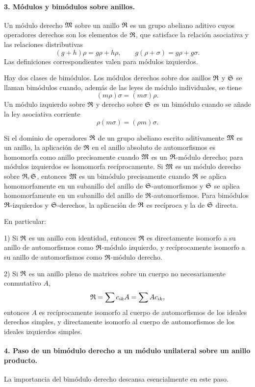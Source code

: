 \paragraph{3. Módulos y bimódulos sobre anillos.}
Un módulo derecho \(\mathfrak M\) sobre un anillo \(\mathfrak R\) es un grupo abeliano aditivo cuyos operadores derechos son los elementos de \(\mathfrak R\), que satisface la relación asociativa y las relaciones distributivas
\[
        (g+h)\rho=g\rho+h\rho,\qquad
        g(\rho+\sigma)=g\rho+g\sigma.                                  \tag{3a}
\]
Las definiciones correspondientes valen para módulos izquierdos.

Hay dos clases de bimódulos. Los módulos derechos sobre dos anillos \(\mathfrak R\) y \(\mathfrak S\) se llaman bimódulos cuando, además de las leyes de módulo individuales, se tiene
\[
        (m\rho)\sigma=(m\sigma)\rho.
\]
Un módulo izquierdo sobre \(\mathfrak R\) y derecho sobre \(\mathfrak S\) es un bimódulo cuando se añade la ley asociativa corriente
\[
        \rho(m\sigma)=(\rho m)\sigma .
\]

Si el dominio de operadores \(\mathfrak R\) de un grupo abeliano escrito aditivamente \(\mathfrak M\) es un anillo, la aplicación de \(\mathfrak R\) en el anillo absoluto de automorfismos es homomorfa como anillo precisamente cuando \(\mathfrak M\) es un \(\mathfrak R\)-módulo derecho; para módulos izquierdos es homomorfa recíprocamente. Si \(\mathfrak M\) es un módulo derecho sobre \(\mathfrak R,\mathfrak S\), entonces \(\mathfrak M\) es un bimódulo precisamente cuando \(\mathfrak R\) se aplica homomorfamente en un subanillo del anillo de \(\mathfrak S\)-automorfismos y \(\mathfrak S\) se aplica homomorfamente en un subanillo del anillo de \(\mathfrak R\)-automorfismos. Para bimódulos \(\mathfrak R\)-izquierdos y \(\mathfrak S\)-derechos, la aplicación de \(\mathfrak R\) es recíproca y la de \(\mathfrak S\) directa.

En particular:

1) Si \(\mathfrak R\) es un anillo con identidad, entonces \(\mathfrak R\) es directamente isomorfo a su anillo de automorfismos como \(\mathfrak R\)-módulo izquierdo, y recíprocamente isomorfo a su anillo de automorfismos como \(\mathfrak R\)-módulo derecho.

2) Si \(\mathfrak R\) es un anillo pleno de matrices sobre un cuerpo no necesariamente conmutativo \(A\),
\[
        \mathfrak R=\sum c_{ik}A=\sum A c_{ik},
\]
entonces \(A\) es recíprocamente isomorfo al cuerpo de automorfismos de los ideales derechos simples, y directamente isomorfo al cuerpo de automorfismos de los ideales izquierdos simples.

\paragraph{4. Paso de un bimódulo derecho a un módulo unilateral sobre un anillo producto.}
La importancia del bimódulo derecho descansa esencialmente en este paso.

